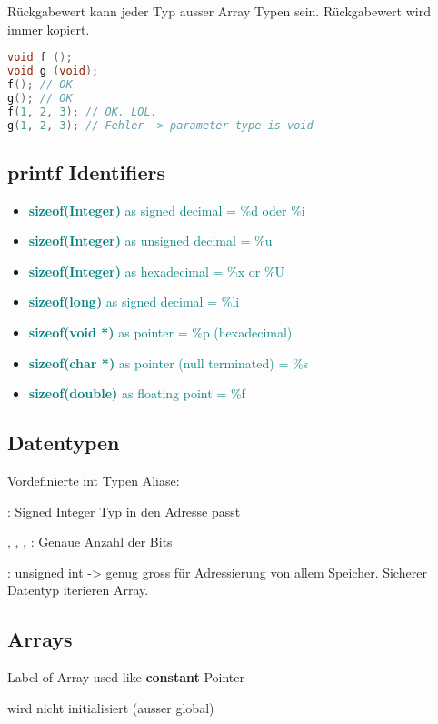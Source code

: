 \begin{multicols*}{4}
Rückgabewert kann jeder Typ ausser Array Typen sein. Rückgabewert wird immer kopiert.

\begin{lstlisting}[language=c]
void f ();
void g (void);
f(); // OK
g(); // OK
f(1, 2, 3); // OK. LOL.
g(1, 2, 3); // Fehler -> parameter type is void
\end{lstlisting}

\subsection{printf Identifiers}
\begin{itemize}
    \item \textcolor{teal}{\textbf{sizeof(Integer)} as signed decimal = \%d oder \%i}
    \item \textcolor{teal}{\textbf{sizeof(Integer)} as unsigned decimal = \%u}
    \item \textcolor{teal}{\textbf{sizeof(Integer)} as hexadecimal = \%x or \%U}
    \item \textcolor{teal}{\textbf{sizeof(long)} as signed decimal = \%li}
    \item \textcolor{teal}{\textbf{sizeof(void *)} as pointer = \%p (hexadecimal)}
    \item \textcolor{teal}{\textbf{sizeof(char *)} as pointer (null terminated) = \%s}
    \item \textcolor{teal}{\textbf{sizeof(double)} as floating point = \%f}
\end{itemize}

\subsection{Datentypen}
Vordefinierte int Typen Aliase:

: Signed Integer Typ in den Adresse passt

, , , : Genaue Anzahl der Bits

: unsigned int -> genug gross für Adressierung von allem Speicher. Sicherer Datentyp iterieren Array.

\subsection{Arrays}
Label of Array used like \textbf{constant} Pointer

 wird nicht initialisiert (ausser global)


\end{multicols*}
